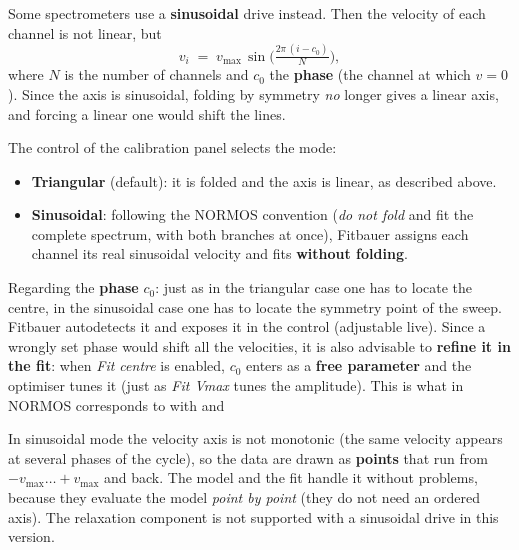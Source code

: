 Some spectrometers use a \textbf{sinusoidal} drive instead. Then the velocity of
each channel is not linear, but
\[
  v_i \;=\; v_{\max}\,\sin\!\Big(\tfrac{2\pi\,(i-c_0)}{N}\Big),
\]
where $N$ is the number of channels and $c_0$ the \textbf{phase} (the channel at
which $v=0$). Since the axis is sinusoidal, folding by symmetry \emph{no} longer
gives a linear axis, and forcing a linear one would shift the lines.


The  control of the calibration panel selects the mode:

\begin{itemize}[nosep]
  \item \textbf{Triangular} (default): it is folded and the axis is linear, as
        described above.
  \item \textbf{Sinusoidal}: following the NORMOS convention (\emph{do not fold}
        and fit the complete spectrum, with both branches at once), Fitbauer
        assigns each channel its real sinusoidal velocity and fits
        \textbf{without folding}.
\end{itemize}

Regarding the \textbf{phase} $c_0$: just as in the triangular case one has to
locate the centre, in the sinusoidal case one has to locate the symmetry point
of the sweep. Fitbauer autodetects it and exposes it in the 
control (adjustable live). Since a wrongly set phase would shift all the
velocities, it is also advisable to \textbf{refine it in the fit}: when
\emph{Fit centre} is enabled, $c_0$ enters as a \textbf{free parameter} and the
optimiser tunes it (just as \emph{Fit Vmax} tunes the amplitude). This is what
in NORMOS corresponds to  with  and

\begin{nota}
In sinusoidal mode the velocity axis is not monotonic (the same velocity appears
at several phases of the cycle), so the data are drawn as \textbf{points} that
run from $-v_{\max}\!\dots\!+v_{\max}$ and back. The model and the fit handle it
without problems, because they evaluate the model \emph{point by point} (they do
not need an ordered axis). The relaxation component is not supported with a
sinusoidal drive in this version.
\end{nota}

